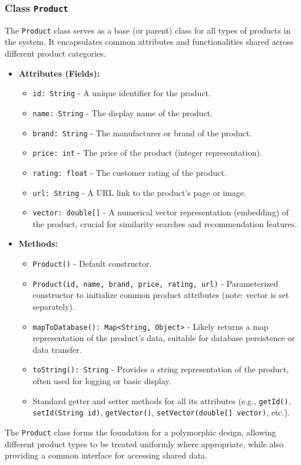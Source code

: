\documentclass{article}
\begin{document}
\subsubsection{Class \texttt{Product}}
The \texttt{Product} class serves as a base (or parent) class for all types of products in the system. It encapsulates common attributes and functionalities shared across different product categories.
\begin{itemize}
    \item \textbf{Attributes (Fields):}
    \begin{itemize}
        \item \texttt{id: String} - A unique identifier for the product.
        \item \texttt{name: String} - The display name of the product.
        \item \texttt{brand: String} - The manufacturer or brand of the product.
        \item \texttt{price: int} - The price of the product (integer representation).
        \item \texttt{rating: float} - The customer rating of the product.
        \item \texttt{url: String} - A URL link to the product's page or image.
        \item \texttt{vector: double[]} - A numerical vector representation (embedding) of the product, crucial for similarity searches and recommendation features.
    \end{itemize}
    \item \textbf{Methods:}
    \begin{itemize}
        \item \texttt{Product()} - Default constructor.
        \item \texttt{Product(id, name, brand, price, rating, url)} - Parameterized constructor to initialize common product attributes (note: vector is set separately).
        \item \texttt{mapToDatabase(): Map<String, Object>} - Likely returns a map representation of the product's data, suitable for database persistence or data transfer.
        \item \texttt{toString(): String} - Provides a string representation of the product, often used for logging or basic display.
        \item Standard getter and setter methods for all its attributes (e.g., \texttt{getId()}, \texttt{setId(String id)}, \texttt{getVector()}, \texttt{setVector(double[] vector)}, etc.).
    \end{itemize}
\end{itemize}
The \texttt{Product} class forms the foundation for a polymorphic design, allowing different product types to be treated uniformly where appropriate, while also providing a common interface for accessing shared data.
\end{document}
